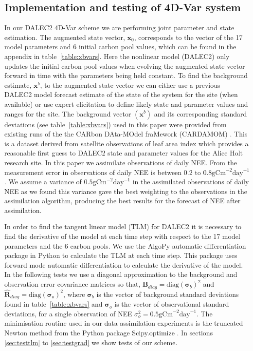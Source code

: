 \documentclass[review]{elsarticle}
\begin{document}
\subsection{Implementation and testing of 4D-Var system} \label{sec:implement4dvar}

In our DALEC2 4D-Var scheme we are performing joint parameter and state estimation. The augmented state vector, $\textbf{x}_0$, corresponds to the vector of the 17 model parameters and 6 initial carbon pool values, which can be found in the appendix in table~\ref{table:xbvars}. Here the nonlinear model (DALEC2) only updates the initial carbon pool values when evolving the augmented state vector forward in time with the parameters being held constant. To find the background estimate, $\textbf{x}^{b}$, to the augmented state vector we can either use a previous DALEC2 model forecast estimate of the state of the system for the site (when available) or use expert elicitation to define likely state and parameter values and ranges for the site. The background vector $(\textbf{x}^b)$ and its corresponding standard deviations (see table~\ref{table:xbvars}) used in this paper were provided from existing runs of the the CARbon DAta-MOdel fraMework (CARDAMOM) \citep{Exbrayat2015}. This is a dataset derived from satellite observations of leaf area index which provides a reasonable first guess to DALEC2 state and parameter values for the Alice Holt research site. In this paper we assimilate observations of daily NEE. From \citet{Richardson200838} the measurement error in observations of daily NEE is between $0.2$ to $0.8\text{gCm}^{-2}\text{day}^{-1}$. We assume a variance of $0.5\text{gCm}^{-2}\text{day}^{-1}$ in the assimilated observations of daily NEE as we found this variance gave the best weighting to the observations in the assimilation algorithm, producing the best results for the forecast of NEE after assimilation.

In order to find the tangent linear model (TLM) for DALEC2 it is necessary to find the derivative of the model at each time step with respect to the 17 model parameters and the 6 carbon pools. We use the AlgoPy automatic differentiation package \citep{Walter2013} in Python to calculate the TLM at each time step. This package uses forward mode automatic differentiation to calculate the derivative of the model. In the following tests we use a diagonal approximation to the background and observation error covariance matrices so that, 
$\textbf{B}_{diag}=\text{diag}(\bm{\sigma}_b)^2$ and $\hat{\textbf{R}}_{diag}=\text{diag}(\bm{\sigma}_o )^2$,
where $\bm{\sigma}_b$ is the vector of background standard deviations found in table~\ref{table:xbvars} and $\bm{\sigma}_o$ is the vector of observational standard deviations, for a single observation of NEE $\sigma_o^{2}=0.5\text{gCm}^{-2}\text{day}^{-1}$. The minimisation routine used in our data assimilation experiments is the truncated Newton method \citep{Nocedal1999} from the Python package Scipy.optimize \citep{scipy2015}. In sections \ref{sec:testtlm} to \ref{sec:testgrad} we show tests of our scheme. 
\end{document}
